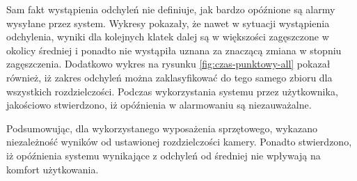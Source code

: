 Sam fakt wystąpienia odchyleń nie definiuje, jak bardzo opóźnione są alarmy wysyłane przez system. Wykresy pokazały, że nawet w sytuacji wystąpienia odchylenia, wyniki dla kolejnych klatek dalej są w większości zagęszczone w okolicy średniej i ponadto nie wystąpiła uznana za znaczącą zmiana w stopniu zagęszczenia. Dodatkowo wykres na rysunku \ref{fig:czas-punktowy-all} pokazał również, iż zakres odchyleń można zaklasyfikować do tego samego zbioru dla wszystkich rozdzielczości.   
Podczas wykorzystania systemu przez użytkownika, jakościowo stwierdzono, iż opóźnienia w alarmowaniu są niezauważalne. 

Podsumowując, dla wykorzystanego wyposażenia sprzętowego, wykazano niezależność wyników od ustawionej rozdzielczości kamery. Ponadto stwierdzono, iż opóźnienia systemu wynikające z odchyleń od średniej nie wpływają na komfort użytkowania.